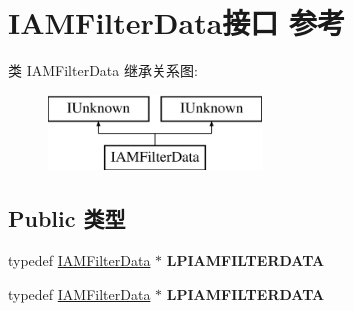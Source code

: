 \hypertarget{interface_i_a_m_filter_data}{}\section{I\+A\+M\+Filter\+Data接口 参考}
\label{interface_i_a_m_filter_data}
类 I\+A\+M\+Filter\+Data 继承关系图\+:\begin{figure}[H]
\begin{center}
\leavevmode
\includegraphics[height=2.000000cm]{interface_i_a_m_filter_data}
\end{center}
\end{figure}
\subsection*{Public 类型}
\begin{DoxyCompactItemize}
\item 
\mbox{\label{interface_i_a_m_filter_data_a13b020fbe67ee908dae3227c448da217}} 
typedef \hyperlink{interface_i_a_m_filter_data}{I\+A\+M\+Filter\+Data} $\ast$ {\bfseries L\+P\+I\+A\+M\+F\+I\+L\+T\+E\+R\+D\+A\+TA}
\item 
\mbox{\label{interface_i_a_m_filter_data_a13b020fbe67ee908dae3227c448da217}} 
typedef \hyperlink{interface_i_a_m_filter_data}{I\+A\+M\+Filter\+Data} $\ast$ {\bfseries L\+P\+I\+A\+M\+F\+I\+L\+T\+E\+R\+D\+A\+TA}
\end{DoxyCompactItemize}
